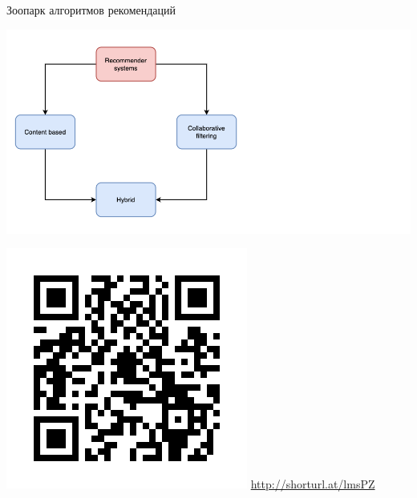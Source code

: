 \documentclass[11pt,aspectratio=169,handout]{beamer}
\begin{document}
\begin{frame}{Зоопарк алгоритмов рекомендаций \cite{ali_2021}}

\begin{center}
\includegraphics[scale=0.27]{images/taxonomy-1.png}
\end{center}

\includegraphics[scale=0.16]{images/poll.png} \hfill \url{http://shorturl.at/lmsPZ}

\end{frame}
\end{document}
